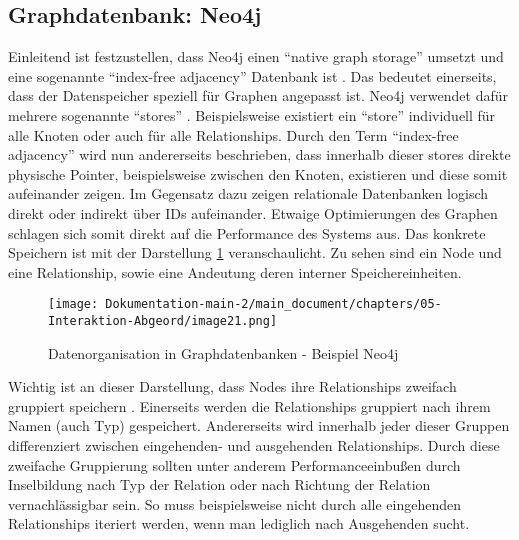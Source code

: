 \subsection{Graphdatenbank: Neo4j}
Einleitend ist festzustellen, dass Neo4j einen \enquote{native graph storage} umsetzt und eine sogenannte \enquote{index-free adjacency} Datenbank ist \cite{robinson2015graph}. Das bedeutet einerseits, dass der Datenspeicher speziell für Graphen angepasst ist. Neo4j verwendet dafür mehrere sogenannte \enquote{stores} \cite{neostores}. Beispielsweise existiert ein \enquote{store} individuell für alle Knoten oder auch für alle Relationships. Durch den Term \enquote{index-free adjacency} wird nun andererseits beschrieben, dass innerhalb dieser stores direkte physische Pointer, beispielsweise zwischen den Knoten, existieren und diese somit aufeinander zeigen. Im Gegensatz dazu zeigen relationale Datenbanken logisch direkt oder indirekt über IDs aufeinander. Etwaige Optimierungen des Graphen schlagen sich somit direkt auf die Performance des Systems aus.
\newline
Das konkrete Speichern ist mit der Darstellung \ref{fig:Dokumentation-main-2/main_document/chapters/05-Interaktion-Abgeord/image21.png} veranschaulicht. Zu sehen sind ein Node und eine Relationship, sowie eine Andeutung deren interner Speichereinheiten.
\begin{figure}[hbt!]
    \centering
    \texttt{[image: Dokumentation-main-2/main\_document/chapters/05-Interaktion-Abgeord/image21.png]}
    \caption{Datenorganisation in Graphdatenbanken - Beispiel Neo4j} \cite{generalStorage}
    \label{fig:Dokumentation-main-2/main_document/chapters/05-Interaktion-Abgeord/image21.png}
\end{figure}
Wichtig ist an dieser Darstellung, dass Nodes ihre Relationships zweifach gruppiert speichern \cite{neo4jrelationshipgrouping}. Einerseits werden die Relationships gruppiert nach ihrem Namen (auch Typ) gespeichert. Andererseits wird innerhalb jeder dieser Gruppen differenziert zwischen eingehenden- und ausgehenden Relationships. Durch diese zweifache Gruppierung sollten unter anderem Performanceeinbußen durch Inselbildung nach Typ der Relation oder nach Richtung der Relation vernachlässigbar sein. So muss beispielsweise nicht durch alle eingehenden Relationships iteriert werden, wenn man lediglich nach Ausgehenden sucht.
